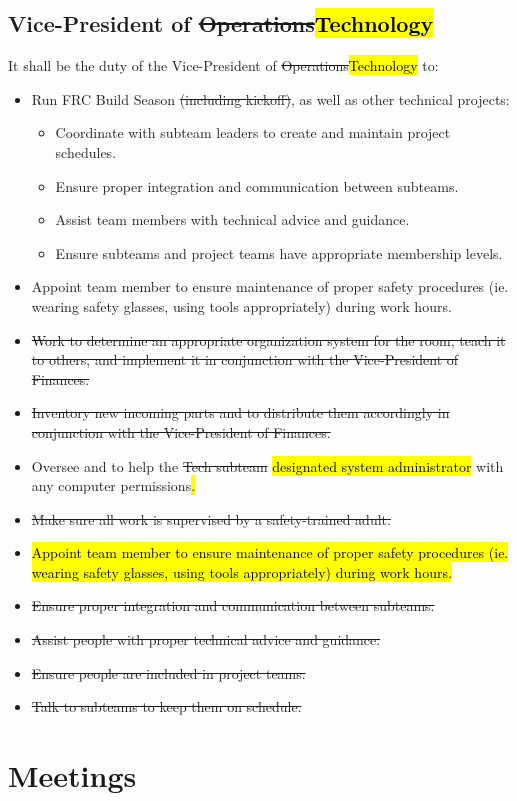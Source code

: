 \documentclass[12pt, a4paper]{article}
\begin{document}
\subsection{Vice-President of \st{Operations}\hl{Technology}}
It shall be the duty of the Vice-President of \st{Operations}\hl{Technology} to:
\begin{itemize}
\item Run FRC Build Season \st{(including kickoff)}, as well as other technical projects:
	\begin{itemize}
		\item Coordinate with subteam leaders to create and maintain project schedules.
		\item Ensure proper integration and communication between subteams.
		\item Assist team members with technical advice and guidance.
		\item Ensure subteams and project teams have appropriate membership levels.
	\end{itemize}
\item Appoint team member to ensure maintenance of proper safety procedures (ie. wearing safety glasses, using tools appropriately) during work hours.
\item \st{Work to determine an appropriate organization system for the room, teach it to others, and implement it in conjunction with the Vice-President of Finances.}
\item \st{Inventory new incoming parts and to distribute them accordingly in conjunction with the Vice-President of Finances.}
\item Oversee and to help the \st{Tech subteam} \hl{designated system administrator} with any computer permissions\hl{.}
\item \st{Make sure all work is supervised by a safety-trained adult.}
\item \hl{Appoint team member to ensure maintenance of proper safety procedures (ie. wearing safety glasses, using tools appropriately) during work hours.}
\item \st{Ensure proper integration and communication between subteams.}
\item \st{Assist people with proper technical advice and guidance.}
\item \st{Ensure people are included in project teams.}
\item \st{Talk to subteams to keep them on schedule.}
\end{itemize}

\section{Meetings}
\end{document}

